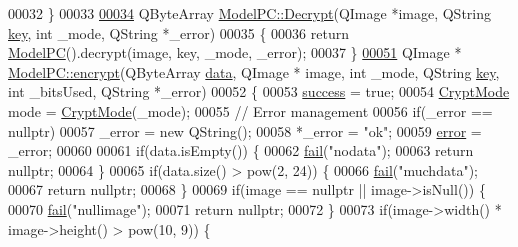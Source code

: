 \begin{DoxyCode}
00032 \}
00033 
\hypertarget{modelpc_8cpp_source.tex_l00034}{}\hyperlink{class_model_p_c_a902abaea4f07995b48c0f2fea6eceb7c}{00034} QByteArray \hyperlink{class_model_p_c_a902abaea4f07995b48c0f2fea6eceb7c}{ModelPC::Decrypt}(QImage *image, QString \hyperlink{namespace_errors_dict_setup_a09c268098d09ffb8e5504f30fa6d5dd9}{key}, \textcolor{keywordtype}{int} \_mode, QString *\_error)
00035 \{
00036     \textcolor{keywordflow}{return} \hyperlink{class_model_p_c_ae12ebe65ec973c02a0de4850a7c1e31c}{ModelPC}().decrypt(image, key, \_mode, \_error);
00037 \}
\hypertarget{modelpc_8cpp_source.tex_l00051}{}\hyperlink{class_model_p_c_a6f191f62d4635d0d3555fcc0be298794}{00051} QImage * \hyperlink{class_model_p_c_a6f191f62d4635d0d3555fcc0be298794}{ModelPC::encrypt}(QByteArray \hyperlink{namespace_errors_dict_setup_af570460846fb9f0c91abd308a095dcdc}{data}, QImage * image, \textcolor{keywordtype}{int} \_mode, QString 
      \hyperlink{namespace_errors_dict_setup_a09c268098d09ffb8e5504f30fa6d5dd9}{key}, \textcolor{keywordtype}{int} \_bitsUsed, QString *\_error)
00052 \{
00053     \hyperlink{class_model_p_c_a945ffbbc44a832b953c191debd448f4c}{success} = \textcolor{keyword}{true};
00054     \hyperlink{class_model_p_c_a296dd7afe3e1c49b3da25fd644fe4ceb}{CryptMode} mode = \hyperlink{class_model_p_c_a296dd7afe3e1c49b3da25fd644fe4ceb}{CryptMode}(\_mode);
00055     \textcolor{comment}{// Error management}
00056     \textcolor{keywordflow}{if}(\_error == \textcolor{keyword}{nullptr})
00057         \_error = \textcolor{keyword}{new} QString();
00058     *\_error = \textcolor{stringliteral}{"ok"};
00059     \hyperlink{class_model_p_c_a4e5a9c0ca1f06fe5bc478b6bf248c37c}{error} = \_error;
00060 
00061     \textcolor{keywordflow}{if}(data.isEmpty()) \{
00062         \hyperlink{class_model_p_c_a47464b59b7e37fcee25e55475708aabd}{fail}(\textcolor{stringliteral}{"nodata"});
00063         \textcolor{keywordflow}{return} \textcolor{keyword}{nullptr};
00064     \}
00065     \textcolor{keywordflow}{if}(data.size() > pow(2, 24)) \{
00066         \hyperlink{class_model_p_c_a47464b59b7e37fcee25e55475708aabd}{fail}(\textcolor{stringliteral}{"muchdata"});
00067         \textcolor{keywordflow}{return} \textcolor{keyword}{nullptr};
00068     \}
00069     \textcolor{keywordflow}{if}(image == \textcolor{keyword}{nullptr} || image->isNull()) \{
00070         \hyperlink{class_model_p_c_a47464b59b7e37fcee25e55475708aabd}{fail}(\textcolor{stringliteral}{"nullimage"});
00071         \textcolor{keywordflow}{return} \textcolor{keyword}{nullptr};
00072     \}
00073     \textcolor{keywordflow}{if}(image->width() * image->height() > pow(10, 9)) \{

\end{DoxyCode}
